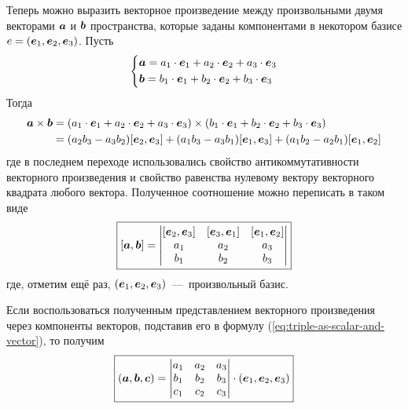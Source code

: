\documentclass[a4paper,12pt]{article}
\begin{document}
  Теперь можно выразить векторное произведение между произвольными двумя векторами $\boldsymbol a$ и $\boldsymbol b$ пространства, которые заданы компонентами в некотором базисе $e \hm= (\bds e_1, \bds e_2, \bds e_3)$.
  Пусть
  \[
    \left\{
      \begin{aligned}
        &\boldsymbol a = a_1 \cdot \boldsymbol e_1 + a_2 \cdot \boldsymbol e_2 + a_3 \cdot \boldsymbol e_3\\
        &\boldsymbol b = b_1 \cdot \boldsymbol e_1 + b_2 \cdot \boldsymbol e_2 + b_3 \cdot \boldsymbol e_3
      \end{aligned}
    \right.
  \]
  Тогда
  \begin{equation*}
  \begin{split}
    \boldsymbol a \times \boldsymbol b
    =\; &(a_1 \cdot \boldsymbol e_1 + a_2 \cdot \boldsymbol e_2 + a_3 \cdot \boldsymbol e_3) \times (b_1 \cdot \boldsymbol e_1 + b_2 \cdot \boldsymbol e_2 + b_3 \cdot \boldsymbol e_3)\\
    =\; &(a_2 b_3 - a_3 b_2)[\boldsymbol e_2, \boldsymbol e_3] + (a_1 b_3 - a_3 b_1)[\boldsymbol e_1, \boldsymbol e_3] + (a_1 b_2 - a_2 b_1)[\boldsymbol e_1, \boldsymbol e_2]
  \end{split}
  \end{equation*}
  где в последнем переходе использовались свойство антикоммутативности векторного произведения и свойство равенства нулевому вектору векторного квадрата любого вектора.
  Полученное соотношение можно переписать в таком виде
  \begin{equation}\label{eq:vector-product}
    \boxed{[\boldsymbol a, \boldsymbol b] = \begin{vmatrix}
      [\boldsymbol e_2, \boldsymbol e_3] & [\boldsymbol e_3, \boldsymbol e_1] & [\boldsymbol e_1, \boldsymbol e_2]\\
      a_1 & a_2 & a_3\\
      b_1 & b_2 & b_3
    \end{vmatrix}}
  \end{equation}
  где, отметим ещё раз, $(\boldsymbol e_1, \boldsymbol e_2, \boldsymbol e_3)$~---~произвольный базис.
  
  Если воспользоваться полученным представлением векторного произведения через компоненты векторов, подставив его в формулу (\ref{eq:triple-as-scalar-and-vector}), то получим
  \begin{equation}\label{eq:triple-product}
    \boxed{(\boldsymbol a, \boldsymbol b, \boldsymbol c) = \begin{vmatrix}
      a_1 & a_2 & a_3\\
      b_1 & b_2 & b_3\\
      c_1 & c_2 & c_3
    \end{vmatrix} \cdot (\boldsymbol e_1, \boldsymbol e_2, \boldsymbol e_3)}
  \end{equation}
\end{document}
